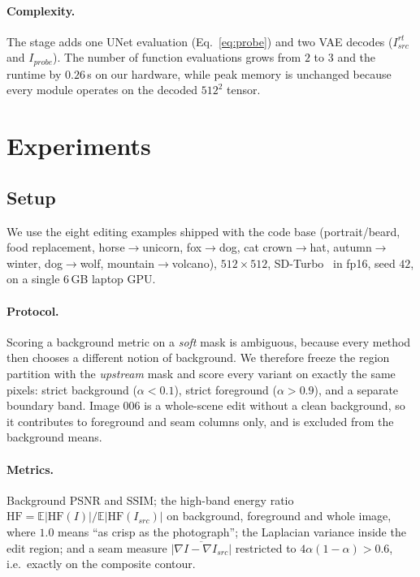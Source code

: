 \documentclass[10pt,twocolumn,letterpaper]{article}
\newcommand{\HF}{\mathrm{HF}}
\begin{document}
\paragraph{Complexity.} The stage adds one UNet evaluation
(Eq.~\eqref{eq:probe}) and two VAE decodes ($I^{rt}_{src}$ and $I_{probe}$). The
number of function evaluations grows from $2$ to $3$ and the runtime by
$0.26$\,s on our hardware, while peak memory is unchanged because every module
operates on the decoded $512^{2}$ tensor.

\section{Experiments}
\label{sec:exp}

\subsection{Setup}
We use the eight editing examples shipped with the code base (portrait/beard,
food replacement, horse$\to$unicorn, fox$\to$dog, cat crown$\to$hat,
autumn$\to$winter, dog$\to$wolf, mountain$\to$volcano), $512\times512$,
SD-Turbo~\cite{sd_turbo} in fp16, seed $42$, on a single 6\,GB laptop GPU.

\paragraph{Protocol.}
Scoring a background metric on a \emph{soft} mask is ambiguous, because every
method then chooses a different notion of background. We therefore freeze the
region partition with the \emph{upstream} mask and score every variant on exactly
the same pixels: strict background ($\alpha<0.1$), strict foreground
($\alpha>0.9$), and a separate boundary band. Image 006 is a whole-scene edit
without a clean background, so it contributes to foreground and seam columns
only, and is excluded from the background means.

\paragraph{Metrics.}
Background PSNR and SSIM; the high-band energy ratio
$\HF=\mathbb{E}|\HF(I)|/\mathbb{E}|\HF(I_{src})|$ on background, foreground and
whole image, where $1.0$ means ``as crisp as the photograph''; the Laplacian
variance inside the edit region; and a seam measure
$\overline{|\nabla I-\nabla I_{src}|}$ restricted to
$4\alpha(1-\alpha)>0.6$, i.e.\ exactly on the composite contour.
\end{document}
